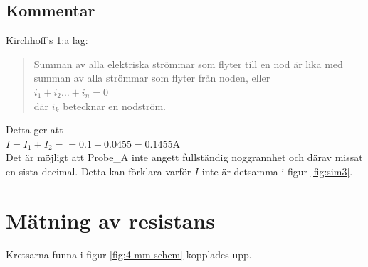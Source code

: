 \documentclass[11pt,a4paper]{article}
\begin{document}
\subsection{Kommentar}\label{}
Kirchhoff's 1:a lag:
\begin{quote}
Summan av alla elektriska strömmar som flyter till en nod är lika med summan av alla strömmar som flyter från noden, eller\\
$i_1 + i_2 \ldots + i_n = 0$\\
där $i_k$ betecknar en nodström.
\end{quote}
Detta ger att \\
$I = I_1 + I_2 =
= 0.1 + 0.0455 = 0.1455 \si{\ampere}$\\
Det är möjligt att Probe\_A inte angett fullständig noggrannhet och därav missat en sista decimal. Detta kan förklara varför $I$ inte är detsamma i figur \ref{fig:sim3}.
\clearpage

\section{Mätning av resistans}\label{}
Kretsarna funna i figur \ref{fig:4-mm-schem} kopplades upp.
\end{document}
